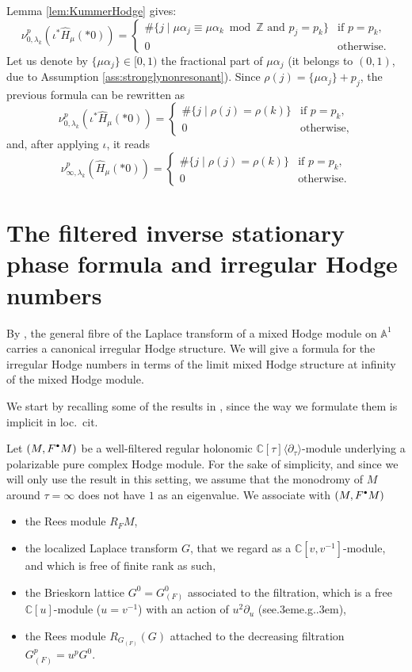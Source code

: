 \documentclass[11pt]{article}
\def\CC{\mathbb{C}}
\def\ZZ{\mathbb{Z}}
\newcommand{\bbullet}{{\scriptscriptstyle\bullet}}
\newcommand{\cbbullet}{{\raisebox{1pt}{$\bbullet$}}}
\def\cf{see\kern.3em}
\def\eg{e.g.\kern.3em}
\let\wh\widehat
\newcommand{\Afu}{\mathbb{A}^{\!1}}
\newcommand{\Cltau}{\CC[\tau]\langle\partial_\tau\rangle}
\begin{document}
Lemma \ref{lem:KummerHodge} gives:
\[
\nu_{0,\lambda_k}^p(\iota^*\wh H_\mu(*0))=
\begin{cases}
\#\{j\mid\mu\alpha_j\equiv\mu\alpha_k\bmod\ZZ\text{ and }p_j=p_k\}&\text{if }p=p_k,\\
0&\text{otherwise}.
\end{cases}
\]
Let us denote by $\{\mu\alpha_j\}\in[0,1)$ the fractional part of $\mu\alpha_j$ (it belongs to $(0,1)$, due to Assumption \ref{ass:stronglynonresonant}). Since $\rho(j)=\{\mu\alpha_j\}+p_j$, the previous formula can be rewritten as
\[
\nu_{0,\lambda_k}^p(\iota^*\wh H_\mu(*0))=
\begin{cases}
\#\{j\mid\rho(j)=\rho(k)\}&\text{if }p=p_k,\\
0&\text{otherwise},
\end{cases}
\]
and, after applying $\iota$, it reads
\begin{equation}\label{eq:nupinfHprimemu}
\nu_{\infty,\lambda_k}^p(\wh H_\mu(*0))=
\begin{cases}
\#\{j\mid\rho(j)=\rho(k)\}&\text{if }p=p_k,\\
0&\text{otherwise}.
\end{cases}
\end{equation}


\section{The filtered inverse stationary phase formula and irregular Hodge \hbox{numbers}}\label{subsec:Laplace}
By \cite[Prop.\,2.61]{Bibi15}, the general fibre of the Laplace transform of a mixed Hodge module on $\Afu$ carries a canonical irregular Hodge structure. We will give a formula for the irregular Hodge numbers in terms of the limit mixed Hodge structure at infinity of the mixed Hodge module.

We start by recalling some of the results in \cite{Bibi08}, since the way we formulate them is implicit in loc.~cit.

Let $(M,F^\cbbullet M)$ be a well-filtered regular holonomic $\Cltau$-module underlying a polarizable pure complex Hodge module. For the sake of simplicity, and since we will only use the result in this setting, we assume that the monodromy of $M$ around $\tau=\infty$ does not have $1$ as an eigenvalue. We associate with $(M,F^\cbbullet M)$
\begin{itemize}
\item
the Rees module $R_FM$,
\item
the localized Laplace transform $G$, that we regard as a $\CC[v,v^{-1}]$-module, and which is free of finite rank as such,
\item
the Brieskorn lattice $G^0=G_{(F)}^0$ associated to the filtration, which is a free $\CC[u]$-module ($u=v^{-1}$) with an action of $u^2\partial_u$ (\cf\eg\cite[App.]{S-Y14}),
\item
the Rees module $R_{G_{(F)}}(G)$ attached to the decreasing filtration $G_{(F)}^p=u^pG^0$.
\end{itemize}
\end{document}
